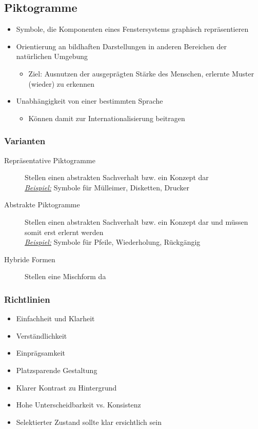 \documentclass
[
	8pt,		%
	ngerman,	%
	a4paper,	%
	landscape,	%
	final		%
]{extarticle}
\newcommand{\example}{\textit{\underline{Beispiel:} }}
\begin{document}
\begin{multicols*}{4}
	\subsection{Piktogramme}
	\begin{itemize}
		\item Symbole, die Komponenten eines Fenstersystems graphisch
		      repräsentieren
		\item Orientierung an bildhaften Darstellungen in anderen Bereichen der
		      natürlichen Umgebung
		      \begin{itemize}[nolistsep]
			      \item Ziel: Ausnutzen der ausgeprägten Stärke des Menschen,
			            erlernte Muster (wieder) zu erkennen
		      \end{itemize}
		\item Unabhängigkeit von einer bestimmten Sprache
		      \begin{itemize}[nolistsep]
			      \item Können damit zur Internationalisierung beitragen
		      \end{itemize}
	\end{itemize}
	\subsubsection{Varianten}
	\begin{description}
		\item[Repräsentative Piktogramme] Stellen einen abstrakten Sachverhalt
		      bzw. ein Konzept dar \\
		      \example Symbole für Mülleimer, Disketten, Drucker
		\item[Abstrakte Piktogramme] Stellen einen abstrakten Sachverhalt bzw.
		      ein Konzept dar und müssen somit erst erlernt werden \\
		      \example Symbole für Pfeile, Wiederholung, Rückgängig
		\item[ Hybride Formen] Stellen eine Mischform da
	\end{description}
	\subsubsection{Richtlinien}
	\begin{itemize}
		\item Einfachheit und Klarheit
		\item Verständlichkeit
		\item Einprägsamkeit
		\item Platzsparende Gestaltung
		\item Klarer Kontrast zu Hintergrund
		\item Hohe Unterscheidbarkeit vs. Konsistenz
		\item Selektierter Zustand sollte klar ersichtlich sein
	\end{itemize}

\end{multicols*}
\end{document}
